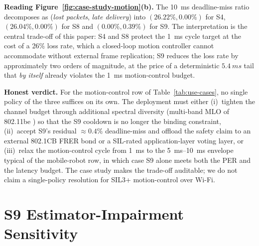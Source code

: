 \documentclass[journal,onecolumn,11pt,a4paper]{IEEEtran}
\begin{document}
\textbf{Reading Figure~\ref{fig:case-study-motion}(b).} The
\SI{10}{ms} deadline-miss ratio decomposes as
(\emph{lost packets}, \emph{late delivery}) into
$(26.22\%, 0.00\%)$ for S4, $(26.04\%, 0.00\%)$ for S8 and
$(0.00\%, 0.39\%)$ for S9. The interpretation is the central
trade-off of this paper: S4 and S8 protect the \SI{1}{ms} cycle
target at the cost of a 26\% loss rate, which a closed-loop
motion controller cannot accommodate without external frame
replication; S9 reduces the loss rate by approximately two orders
of magnitude, at the price of a deterministic $\SI{5.4}{ms}$ tail
that \emph{by itself} already violates the \SI{1}{ms} motion-control
budget.

\textbf{Honest verdict.} For the motion-control row of
Table~\ref{tab:use-cases}, no single policy of the three suffices
on its own. The deployment must either (i)~tighten the channel
budget through additional spectral diversity (multi-band MLO of
802.11be \cite{Lop19}) so that the S9 cooldown is no longer the
binding constraint, (ii)~accept S9's residual $\approx 0.4\%$
deadline-miss and offload the safety claim to an external
802.1CB FRER bond \cite{IEEE802CB} or a SIL-rated
application-layer voting layer, or (iii)~relax the motion-control
cycle from \SI{1}{ms} to the \SIrange{5}{10}{ms} envelope
typical of the mobile-robot row, in which case S9 alone meets
both the PER and the latency budget. The case study makes the
trade-off auditable; we do not claim a single-policy resolution
for SIL3+ motion-control over Wi-Fi.

\section{S9 Estimator-Impairment Sensitivity}
\label{sec:tab10}
\end{document}
